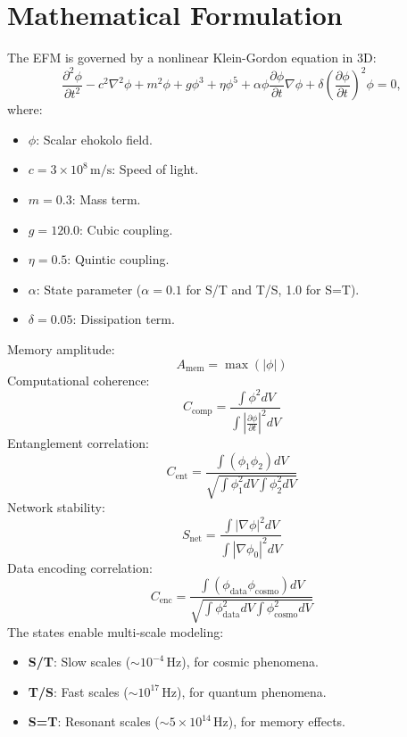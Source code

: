 \documentclass[11pt]{article}
\begin{document}
\section{Mathematical Formulation}
The EFM is governed by a nonlinear Klein-Gordon equation in 3D:
\begin{equation}
\frac{\partial^2 \phi}{\partial t^2} - c^2 \nabla^2 \phi + m^2 \phi + g \phi^3 + \eta \phi^5 + \alpha \phi \frac{\partial \phi}{\partial t} \nabla \phi + \delta \left(\frac{\partial \phi}{\partial t}\right)^2 \phi = 0,
\end{equation}
where:
\begin{itemize}
    \item \(\phi\): Scalar ehokolo field.
    \item \(c = 3 \times 10^8 \, \text{m/s}\): Speed of light.
    \item \(m = 0.3\): Mass term.
    \item \(g = 120.0\): Cubic coupling.
    \item \(\eta = 0.5\): Quintic coupling.
    \item \(\alpha\): State parameter (\(\alpha = 0.1\) for S/T and T/S, 1.0 for S=T).
    \item \(\delta = 0.05\): Dissipation term.
\end{itemize}
Memory amplitude:
\begin{equation}
A_{\text{mem}} = \max(|\phi|)
\end{equation}
Computational coherence:
\begin{equation}
C_{\text{comp}} = \frac{\int \phi^2 dV}{\int \left| \frac{\partial \phi}{\partial t} \right|^2 dV}
\end{equation}
Entanglement correlation:
\begin{equation}
C_{\text{ent}} = \frac{\int (\phi_1 \phi_2) dV}{\sqrt{\int \phi_1^2 dV \int \phi_2^2 dV}}
\end{equation}
Network stability:
\begin{equation}
S_{\text{net}} = \frac{\int |\nabla \phi|^2 dV}{\int |\nabla \phi_0|^2 dV}
\end{equation}
Data encoding correlation:
\begin{equation}
C_{\text{enc}} = \frac{\int (\phi_{\text{data}} \phi_{\text{cosmo}}) dV}{\sqrt{\int \phi_{\text{data}}^2 dV \int \phi_{\text{cosmo}}^2 dV}}
\end{equation}
The states enable multi-scale modeling:
\begin{itemize}
    \item \textbf{S/T}: Slow scales (\(\sim 10^{-4} \, \text{Hz}\)), for cosmic phenomena.
    \item \textbf{T/S}: Fast scales (\(\sim 10^{17} \, \text{Hz}\)), for quantum phenomena.
    \item \textbf{S=T}: Resonant scales (\(\sim 5 \times 10^{14} \, \text{Hz}\)), for memory effects.
\end{itemize}
\end{document}
